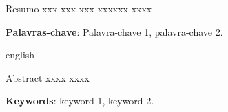 \documentclass[
	12pt,				%
	openright,			%
	twoside,			%
	a4paper,			%
	chapter=TITLE,		%
	section=TITLE,		%
	english,			%
	french,				%
	spanish,			%
	brazil				%
	]{abntex2}
\begin{document}
\begin{agradecimentos}



\end{agradecimentos}



\setlength{\absparsep}{8pt}
\linespread{1.0}
\begin{resumo}[Resumo]

{\footnotesize
Resumo xxx xxx xxx xxxxxx xxxx
}
 \vspace{\onelineskip}
 
  \textbf{Palavras-chave}: Palavra-chave 1, palavra-chave 2.

\end{resumo}

\linespread{1.0}
\begin{resumo}[Abstract]
 \begin{otherlanguage*}{english}
 {\footnotesize
Abstract xxxx xxxx 

}
   \vspace{\onelineskip}
 
   \noindent 
   \textbf{Keywords}: keyword 1, keyword 2.
 \end{otherlanguage*}
\end{resumo}



\listoffigures*
\cleardoublepage

\listoftables*
\cleardoublepage

\begin{siglas}
  \item
  
\end{siglas}

\begin{simbolos}

  \item
\end{simbolos}
\end{document}
